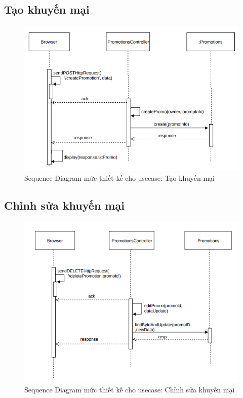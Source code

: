 \subsection{Tạo khuyến mại}
\begin{figure}[H]
	\centering
	\includegraphics[width=12cm]{Image/cr2.png}
	\vspace{0.5cm}
	\caption{Sequence Diagram mức thiết kế cho usecase: Tạo khuyến mại}
\end{figure}
\subsection{Chỉnh sửa khuyến mại}
\begin{figure}[H]
	\centering
	\includegraphics[width=12cm]{Image/cs.png}
	\vspace{0.5cm}
	\caption{Sequence Diagram mức thiết kế cho usecase: Chỉnh sửa khuyến mại}
\end{figure}